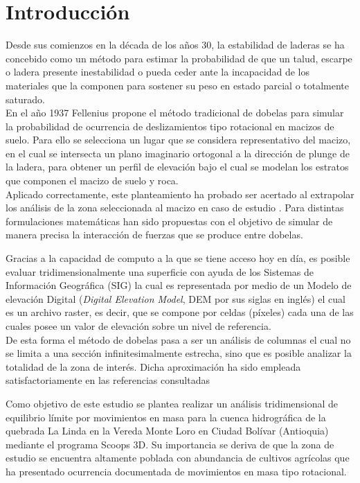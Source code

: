 \chapter{Introducci\'{o}n}
Desde sus comienzos en la d\'ecada de los a\~{n}os 30, la estabilidad de laderas se ha concebido como un m\'etodo para estimar la probabilidad de que un talud, escarpe o ladera presente inestabilidad o pueda ceder ante la incapacidad de los materiales que la componen para sostener su peso en estado parcial o totalmente saturado.\\


En el a\~{n}o 1937 Fellenius \cite{fellenius1936} propone el m\'etodo tradicional de dobelas para simular la probabilidad de ocurrencia de deslizamientos tipo rotacional en macizos de suelo. Para ello se selecciona un lugar que se considera representativo del macizo, en el cual se intersecta un plano imaginario ortogonal a la direcci\'on de plunge de la ladera, para obtener un perfil de elevaci\'on bajo el cual se modelan los estratos que componen el macizo de suelo y roca.\\

Aplicado correctamente, este planteamiento ha probado ser acertado al extrapolar los an\'alisis de la zona seleccionada al macizo en caso de estudio \cite{alonso1995effect}. Para distintas formulaciones matem\'aticas han sido propuestas  con el objetivo de simular de manera precisa la interacci\'on de fuerzas que se produce entre dobelas.

Gracias a la capacidad de computo a la que se tiene acceso hoy en d\'ia, es posible evaluar tridimensionalmente una superficie con ayuda de los Sistemas de Informaci\'on Geogr\'afica (SIG) la cual es representada por medio de un Modelo de elevaci\'on Digital (\textit{Digital Elevation Model}, DEM por sus siglas en ingl\'es) el cual es un archivo raster, es decir, que se compone por celdas (p\'ixeles) cada una de las cuales posee un valor de elevaci\'on sobre un nivel de referencia.
\\
De esta forma el m\'etodo de dobelas pasa a ser un an\'alisis de columnas el cual no se limita a una secci\'on infinitesimalmente estrecha, sino que es posible analizar la totalidad de la zona de inter\'es. Dicha aproximaci\'on ha sido empleada satisfactoriamente en las referencias consultadas  \cite{reid2015scoops3d} \cite{hungr1989evaluation}  \cite{stark1998performance} \par

Como objetivo de este estudio se plantea realizar un an\'alisis tridimensional de equilibrio l\'imite por movimientos en masa para la cuenca hidrogr\'afica de la quebrada La Linda en la Vereda Monte Loro en Ciudad Bol\'ivar (Antioquia) mediante el programa Scoops 3D.
Su importancia se deriva de que la zona de estudio se encuentra altamente poblada \cite{sgc2013} con abundancia de cultivos agr\'icolas que ha presentado ocurrencia documentada de movimientos en masa tipo rotacional.\\

